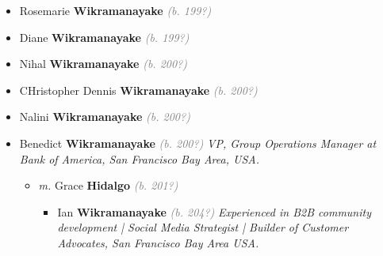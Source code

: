 \documentclass[10pt, openany]{book}
\begin{document}
\begin{itemize}
{\begin{itemize}
{\begin{itemize}
{\begin{itemize}
{ }
\item{Rosemarie \textbf{Wikramanayake} \textcolor{gray}{\textit{(b. 199?)}}
 }
\item{Diane \textbf{Wikramanayake} \textcolor{gray}{\textit{(b. 199?)}}
 }
\item{Nihal \textbf{Wikramanayake} \textcolor{gray}{\textit{(b. 200?)}}
 }
\item{CHristopher Dennis \textbf{Wikramanayake} \textcolor{gray}{\textit{(b. 200?)}}
  }
\item{Nalini \textbf{Wikramanayake} \textcolor{gray}{\textit{(b. 200?)}}
 }
\item{Benedict \textbf{Wikramanayake} \textcolor{gray}{\textit{(b. 200?)}} \textcolor{slmaroon}{\textit{VP, Group Operations Manager at Bank of America, San Francisco Bay Area, USA.}}
\begin{itemize}
\item{\textit{m.} Grace \textbf{Hidalgo} \textcolor{gray}{\textit{(b. 201?)}}   \label{couple:00004052:00004053} \begin{itemize}
\item{Ian \textbf{Wikramanayake} \textcolor{gray}{\textit{(b. 204?)}} \textcolor{slmaroon}{\textit{Experienced in B2B community development | Social Media Strategist | Builder of Customer Advocates, San Francisco Bay Area USA.}}
 }
\end{itemize}}
\end{itemize}
 }
\end{itemize}}
\end{itemize}
  }
\end{itemize}}
\end{itemize}
  
\end{document}
